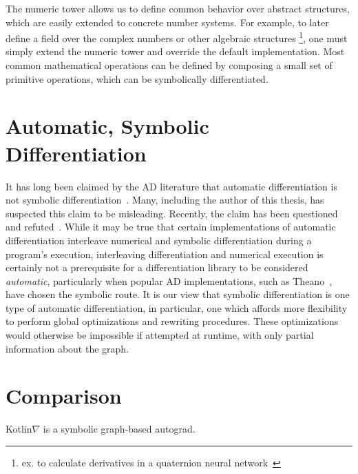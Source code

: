 \documentclass[12pt,initial,twoside,maitrise]{dms}
\numberwithin{equation}{section}
\numberwithin{table}{chapter}
\numberwithin{figure}{chapter}
\begin{document}
The numeric tower allows us to define common behavior over abstract structures, which are easily extended to concrete number systems. For example, to later define a field over the complex numbers or other algebraic structures \footnote{ex. to calculate derivatives in a quaternion neural network~\cite{isokawa2003quaternion}}, one must simply extend the numeric tower and override the default implementation. Most common mathematical operations can be defined by composing a small set of primitive operations, which can be symbolically differentiated.

\section{Automatic, Symbolic Differentiation}

It has long been claimed by the AD literature that automatic differentiation is not symbolic differentiation~\cite{baydin-survey}. Many, including the author of this thesis, has suspected this claim to be misleading. Recently, the claim has been questioned~\cite{wang2018demystifying} and refuted~\cite{laue2019equivalence}. While it may be true that certain implementations of automatic differentiation interleave numerical and symbolic differentiation during a program's execution, interleaving differentiation and numerical execution is certainly not a prerequisite for a differentiation library to be considered \textit{automatic}, particularly when popular AD implementations, such as Theano~\cite{theano}, have chosen the symbolic route. It is our view that symbolic differentiation is one type of automatic differentiation, in particular, one which affords more flexibility to perform global optimizations and rewriting procedures. These optimizations would otherwise be impossible if attempted at runtime, with only partial information about the graph.

\section{Comparison}\label{sec:comparison}

Kotlin$\nabla$ is a symbolic graph-based autograd.
\end{document}
